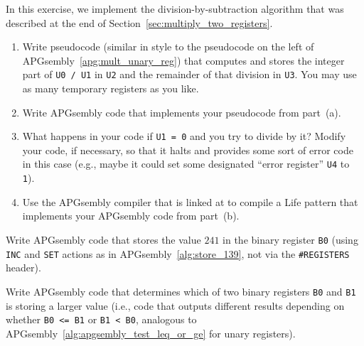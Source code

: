 \begin{multicols}{2}
\mfilbreak


\begin{problem}\label{exer:division_by_subtraction}
	In this exercise, we implement the division-by-subtraction algorithm that was described at the end of Section~\ref{sec:multiply_two_registers}.\smallskip

	\begin{enumerate}[label=\bf\color{ocre}(\alph*)]
		\item Write pseudocode (similar in style to the pseudocode on the left of APGsembly~\ref{apg:mult_unary_reg}) that computes and stores the integer part of \texttt{U0 / U1} in \texttt{U2} and the remainder of that division in \texttt{U3}. You may use as many temporary registers as you like.
		
		\item Write APGsembly code that implements your pseudocode from part~(a).
		
		\item What happens in your code if \texttt{U1 = 0} and you try to divide by it? Modify your code, if necessary, so that it halts and provides some sort of error code in this case (e.g., maybe it could set some designated ``error register'' \texttt{U4} to \texttt{1}).
		
		\item Use the APGsembly compiler that is linked at  to compile a Life pattern that implements your APGsembly code from part~(b).
	\end{enumerate}
\end{problem}


\mfilbreak


\begin{problem}\label{exer:universal_computation_apgsembly_set_binary_value}
	Write APGsembly code that stores the value $241$ in the binary register \texttt{B0} (using \texttt{INC} and \texttt{SET} actions as in APGsembly~\ref{alg:store_139}, not via the \texttt{\#REGISTERS} header).
\end{problem}


\mfilbreak


\begin{problem}\label{exer:universal_computation_apgsembly_binary_compare}
	Write APGsembly code that determines which of two binary registers \texttt{B0} and \texttt{B1} is storing a larger value (i.e., code that outputs different results depending on whether \texttt{B0 <= B1} or \texttt{B1 < B0}, analogous to APGsembly~\ref{alg:apgsembly_test_leq_or_ge} for unary registers).
\end{problem}



\end{multicols}
